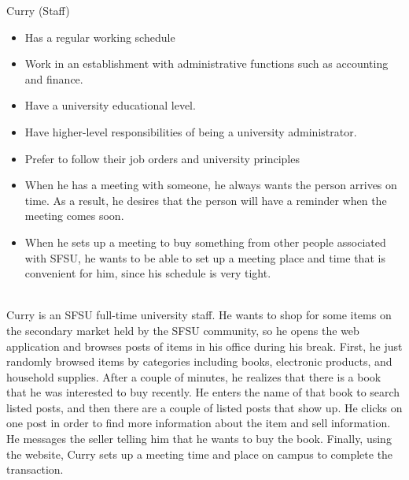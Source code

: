 \begin{description}[font=\bfseries\itshape]
\item[Actor:]Curry (Staff)
\item[About:]\hfill
\begin{itemize}[leftmargin=0mm]
\item Has a regular working schedule
\item Work in an establishment with administrative functions such as accounting and finance.
\item Have a university educational level.
\item Have higher-level responsibilities of being a university administrator.
\item Prefer to follow their job orders and university principles
\end{itemize}
\item[Goals \& Scenario:]\hfill
\begin{itemize}[leftmargin=0mm]
\item When he has a meeting with someone, he always wants the person arrives on time. As a result, he desires that the person will have a reminder when the meeting comes soon.
\item When he sets up a meeting to buy something from other people associated with SFSU, he wants to be able to set up a meeting place and time that is convenient for him, since his schedule is very tight.
\end{itemize}
\item[Use Case:]\hfill\\
Curry is an SFSU full-time university staff. He wants to shop for some items on the secondary market held by the SFSU community, so he opens the web application and browses posts of items in his office during his break. First, he just randomly browsed items by categories including books, electronic products, and household supplies. After a couple of minutes, he realizes that there is a book that he was interested to buy recently. He enters the name of that book to search listed posts, and then there are a couple of listed posts that show up. He clicks on one post in order to find more information about the item and sell information. He messages the seller telling him that he wants to buy the book. Finally, using the website, Curry sets up a meeting time and place on campus to complete the transaction.
\end{description}